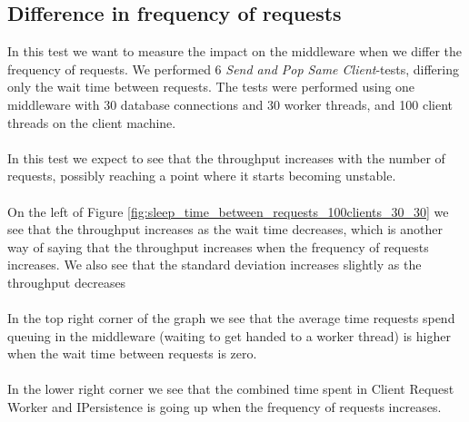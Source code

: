 \documentclass{article}
\begin{document}
        \subsection{Difference in frequency of requests}
            \label{sec:difference_in_frequency_of_requests}
            In this test we want to measure the impact on the middleware when we differ the frequency of requests. We performed 6 \textit{Send and Pop Same Client}-tests, differing only the wait time between requests. The tests were performed using one middleware with 30 database connections and 30 worker threads, and 100 client threads on the client machine.\\
            \\
            In this test we expect to see that the throughput increases with the number of requests, possibly reaching a point where it starts becoming unstable.\\
            \\
            On the left of Figure \ref{fig:sleep_time_between_requests_100clients_30_30} we see that the throughput increases as the wait time decreases, which is another way of saying that the throughput increases when the frequency of requests increases. We also see that the standard deviation increases slightly as the throughput decreases\\
            \\
            In the top right corner of the graph we see that the average time requests spend queuing in the middleware (waiting to get handed to a worker thread) is higher when the wait time between requests is zero.\\
            \\
            In the lower right corner we see that the combined time spent in Client Request Worker and IPersistence is going up when the frequency of requests increases.
\end{document}

